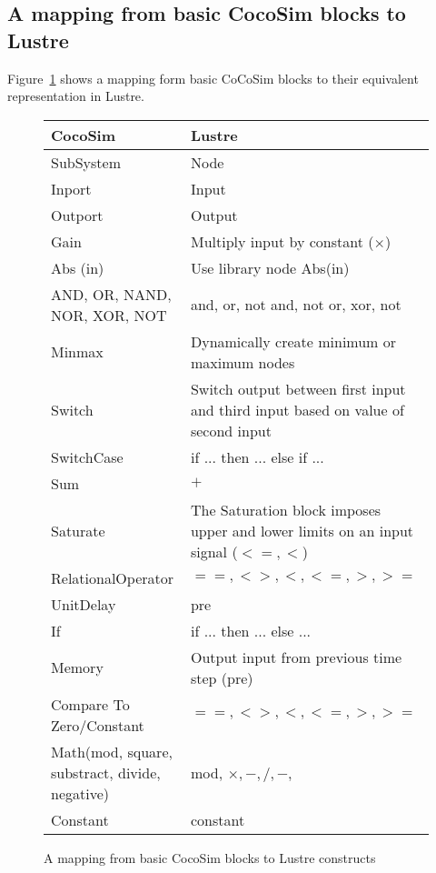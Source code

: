 \documentclass{llncs}
\begin{document}
\subsection{A mapping from basic CocoSim blocks to Lustre}
Figure~\ref{basicmapping} shows a mapping form basic CoCoSim blocks to their equivalent representation in Lustre.


\begin{figure}[t]
\centering
{
\begin{tabular}{lp{5cm}}
\hline
\textbf{CocoSim} & \textbf{Lustre}  \\
\hline
SubSystem & 
Node
\\
Inport &
Input
\\
Outport &
Output
\\
Gain &
Multiply input by constant ($\times$)
\\

Abs (in) &
Use library node Abs(in)
\\

AND, OR, NAND, NOR, XOR, NOT
&
and, or, not and, not or, xor, not
\\

Minmax &
{Dynamically create minimum or maximum nodes}
\\

Switch &
{Switch output between first input and third input based on value of second input}
\\

SwitchCase &
{if ... then ... else if ... }
\\

Sum &
$+$
\\

Saturate &
The Saturation block imposes upper and lower limits on an input signal ($<=, <$)
\\

RelationalOperator &
$==, <>, <, <=, >, >=$
\\

UnitDelay &
pre
\\

If &
if ... then ... else ...
\\

Memory &
Output input from previous time step (pre)
\\

Compare To Zero/Constant  &
$==, <>, <, <=, >, >=$
\\

Math(mod, square, substract, divide, negative) &
mod, $\times, -, /, - $, 
\\

Constant &
constant
\\

\hline
\end{tabular}
}
\caption{A mapping from basic CocoSim blocks to Lustre constructs}
\label{basicmapping}
\end{figure}
\end{document}

